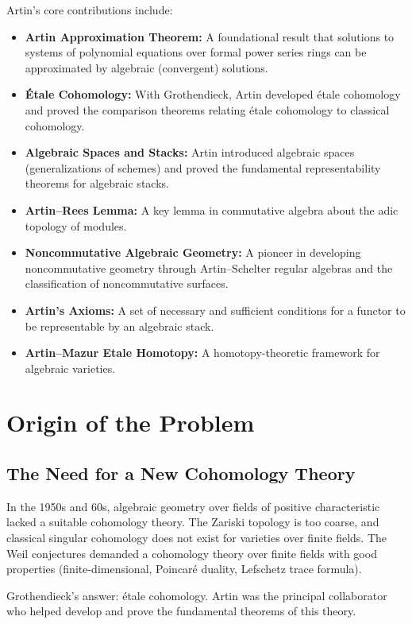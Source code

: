 Artin's core contributions include:
\begin{itemize}
    \item \textbf{Artin Approximation Theorem:} A foundational result that solutions to systems of polynomial equations over formal power series rings can be approximated by algebraic (convergent) solutions.
    \item \textbf{\'Etale Cohomology:} With Grothendieck, Artin developed \'etale cohomology and proved the comparison theorems relating \'etale cohomology to classical cohomology.
    \item \textbf{Algebraic Spaces and Stacks:} Artin introduced algebraic spaces (generalizations of schemes) and proved the fundamental representability theorems for algebraic stacks.
    \item \textbf{Artin--Rees Lemma:} A key lemma in commutative algebra about the adic topology of modules.
    \item \textbf{Noncommutative Algebraic Geometry:} A pioneer in developing noncommutative geometry through Artin--Schelter regular algebras and the classification of noncommutative surfaces.
    \item \textbf{Artin's Axioms:} A set of necessary and sufficient conditions for a functor to be representable by an algebraic stack.
    \item \textbf{Artin--Mazur Etale Homotopy:} A homotopy-theoretic framework for algebraic varieties.
\end{itemize}

\section{Origin of the Problem}

\subsection{The Need for a New Cohomology Theory}

In the 1950s and 60s, algebraic geometry over fields of positive characteristic lacked a suitable cohomology theory. The Zariski topology is too coarse, and classical singular cohomology does not exist for varieties over finite fields. The Weil conjectures demanded a cohomology theory over finite fields with good properties (finite-dimensional, Poincar\'e duality, Lefschetz trace formula).

Grothendieck's answer: \'etale cohomology. Artin was the principal collaborator who helped develop and prove the fundamental theorems of this theory.

